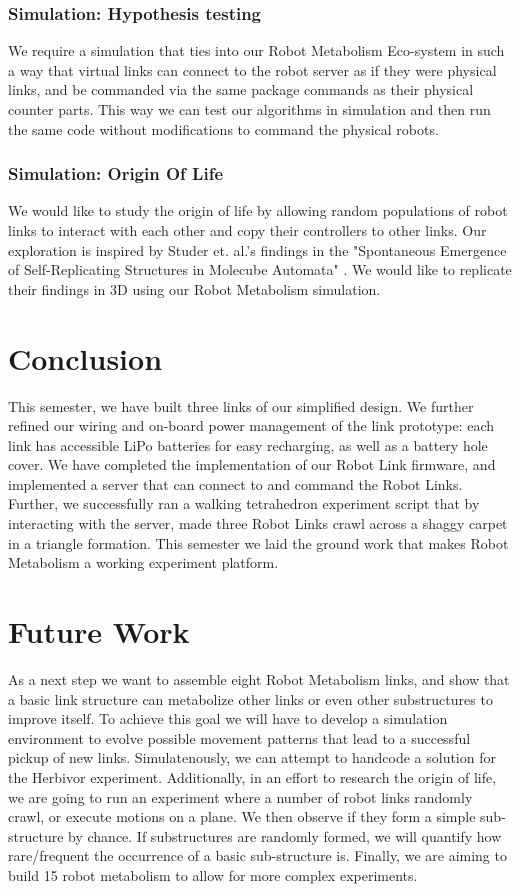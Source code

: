 \documentclass[letterpaper, 10 pt, conference]{ieeeconf}  %
\begin{document}
\subsubsection{Simulation: Hypothesis testing}
We require a simulation that ties into our Robot Metabolism Eco-system in such a way that virtual links can connect to the robot server as if they were physical links, and be commanded via the same package commands as their physical counter parts. This way we can test our algorithms in simulation and then run the same code without modifications to command the physical robots.
\subsubsection{Simulation: Origin Of Life}
We would like to study the origin of life by allowing random populations of robot links to interact with each other and copy their controllers to other links. Our exploration is inspired by Studer et. al.'s findings in the "Spontaneous Emergence of Self-Replicating Structures in Molecube Automata" \cite{Studer2006}.  We would like to replicate their findings in 3D using our Robot Metabolism simulation.

\section{Conclusion}
This semester, we have built three links of our simplified design. We further refined our wiring and on-board power management of the link prototype: each link has accessible LiPo batteries for easy recharging, as well as a battery hole cover. We have completed the implementation of our Robot Link firmware, and implemented a server that can connect to and command the Robot Links. Further, we successfully ran a walking tetrahedron experiment script that by interacting with the server, made three Robot Links crawl across a shaggy carpet in a triangle formation. This semester we laid the ground work that makes Robot Metabolism a working experiment platform.
\section{Future Work}
As a next step we want to assemble eight Robot Metabolism links, and show that a basic link structure can metabolize other links or even other substructures to improve itself. To achieve this goal we will have to develop a simulation environment to evolve possible movement patterns that lead to a successful pickup of new links. Simulatenously, we can attempt to handcode a solution for the Herbivor experiment. Additionally, in an effort to research the origin of life, we are going to run an experiment where a number of robot links randomly crawl, or execute motions on a plane. We then observe if they form a simple sub-structure by chance. If substructures are randomly formed, we will quantify how rare/frequent the occurrence of a basic sub-structure is. Finally, we are aiming to build 15 robot metabolism to allow for more complex experiments.
\end{document}
